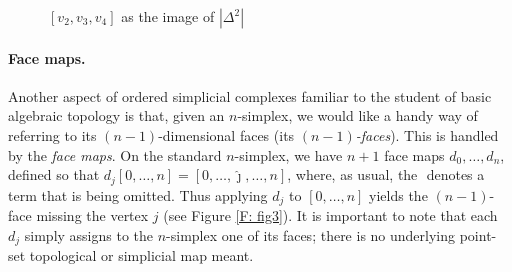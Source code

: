 \documentclass[12pt]{article}
\theoremstyle{plain}
\theoremstyle{definition}
\theoremstyle{remark}
\begin{document}
\begin{figure}[!htp]
\begin{center}
\end{center}
\caption{$[v_2,v_3,v_4]$ as the image of $|\Delta^2|$}\label{F: fig5}
\end{figure}

\paragraph{Face maps.} Another aspect of ordered simplicial complexes familiar to the student of basic algebraic topology is that, given an $n$-simplex, we would like a handy way of referring to its $(n-1)$-dimensional faces (its \emph{$(n-1)$-faces}). This is handled by the \emph{face maps}.  On the standard $n$-simplex, we have $n+1$ face maps $d_0,\ldots, d_n$, defined so that $d_j[0,\ldots, n]=[0,\ldots, \hat \jmath,\ldots, n]$, where, as usual, the $\hat{}$ denotes a term that is being omitted. Thus applying $d_j$ to $[0,\ldots, n]$ yields  the $(n-1)$-face missing the vertex $j$ (see Figure \ref{F: fig3}). It is important to note that each $d_j$ simply assigns to the $n$-simplex one of its faces;  there is no underlying point-set topological or simplicial map meant.
\end{document}
